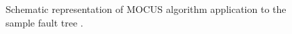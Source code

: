 \begin{figure}
  
  \caption{Schematic representation of MOCUS algorithm application to the sample fault tree \cite{aras_dissertation_2024}.}
  \label{fig:mocus_flow}
\end{figure}